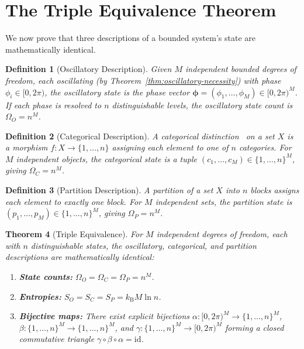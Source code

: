 \documentclass[11pt,twocolumn,a4paper]{article}
\newtheorem{theorem}{Theorem}[section]
\newtheorem{definition}[theorem]{Definition}
\newcommand{\kb}{k_{\mathrm{B}}}
\begin{document}
\section{The Triple Equivalence Theorem}
\label{sec:triple-equivalence}

We now prove that three descriptions of a bounded system's state
are mathematically identical.

\begin{definition}[Oscillatory Description]
\label{def:oscillatory}
Given $M$ independent bounded degrees of freedom, each oscillating
(by Theorem~\ref{thm:oscillatory-necessity}) with phase
$\phi_i \in [0, 2\pi)$, the oscillatory state is the phase vector
$\boldsymbol{\phi} = (\phi_1, \ldots, \phi_M) \in [0, 2\pi)^M$.
If each phase is resolved to $n$ distinguishable levels, the
oscillatory state count is $\Omega_O = n^M$.
\end{definition}

\begin{definition}[Categorical Description]
\label{def:categorical}
A \emph{categorical distinction}~\citep{maclane1998} on a set $X$ is
a morphism $f : X \to \{1, \ldots, n\}$ assigning each element to one
of $n$ categories.  For $M$ independent objects, the categorical state
is a tuple $(c_1, \ldots, c_M) \in \{1, \ldots, n\}^M$, giving
$\Omega_C = n^M$.
\end{definition}

\begin{definition}[Partition Description]
\label{def:partitional}
A \emph{partition} of a set $X$ into $n$ blocks assigns each element
to exactly one block.  For $M$ independent sets, the partition state
is $(p_1, \ldots, p_M) \in \{1, \ldots, n\}^M$, giving
$\Omega_P = n^M$.
\end{definition}

\begin{theorem}[Triple Equivalence]
\label{thm:triple-equivalence}
For $M$ independent degrees of freedom, each with $n$ distinguishable
states, the oscillatory, categorical, and partition descriptions are
mathematically identical:
\begin{enumerate}[leftmargin=*,itemsep=1pt]
\item \textbf{State counts:}
  $\Omega_O = \Omega_C = \Omega_P = n^M$.
\item \textbf{Entropies:}
  $S_O = S_C = S_P = \kb M \ln n$.
\item \textbf{Bijective maps:} There exist explicit bijections
  $\alpha : [0,2\pi)^M \to \{1,\ldots,n\}^M$,
  $\beta : \{1,\ldots,n\}^M \to \{1,\ldots,n\}^M$, and
  $\gamma : \{1,\ldots,n\}^M \to [0,2\pi)^M$ forming a closed
  commutative triangle $\gamma \circ \beta \circ \alpha = \mathrm{id}$.
\end{enumerate}
\end{theorem}
\end{document}
